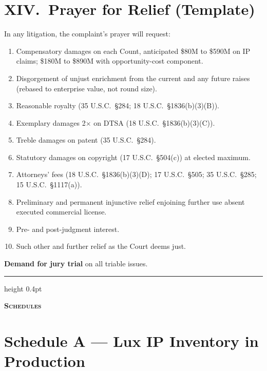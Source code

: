 \documentclass[11pt,letterpaper]{article}
\begin{document}
\section*{XIV.\ Prayer for Relief (Template)}

In any litigation, the complaint's prayer will request:

\begin{enumerate}[leftmargin=1.5em,itemsep=0.1em]
\item Compensatory damages on each Count, anticipated \$80M to \$590M
on IP claims; \$180M to \$890M with opportunity-cost component.
\item Disgorgement of unjust enrichment from the current and any future raises (rebased to enterprise value, not round size).
\item Reasonable royalty (35 U.S.C.\ \S 284; 18 U.S.C.\ \S 1836(b)(3)(B)).
\item Exemplary damages 2$\times$ on DTSA (18 U.S.C.\ \S 1836(b)(3)(C)).
\item Treble damages on patent (35 U.S.C.\ \S 284).
\item Statutory damages on copyright (17 U.S.C.\ \S 504(c)) at elected
maximum.
\item Attorneys' fees (18 U.S.C.\ \S 1836(b)(3)(D); 17 U.S.C.\ \S 505;
35 U.S.C.\ \S 285; 15 U.S.C.\ \S 1117(a)).
\item Preliminary and permanent injunctive relief enjoining further
use absent executed commercial license.
\item Pre- and post-judgment interest.
\item Such other and further relief as the Court deems just.
\end{enumerate}

\textbf{Demand for jury trial} on all triable issues.

\vspace{1em}
\hrule height 0.4pt
\vspace{0.5em}
\begin{center}\textbf{\textsc{Schedules}}\end{center}
\vspace{0.5em}

\section*{Schedule A --- Lux IP Inventory in Production}
\end{document}
